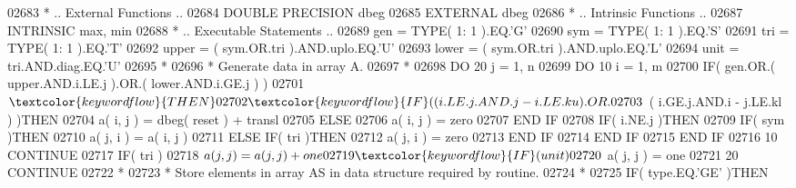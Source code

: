 \begin{DoxyCode}
02683 \textcolor{comment}{*     .. External Functions ..}
02684       \textcolor{keywordtype}{DOUBLE PRECISION}   dbeg
02685       \textcolor{keywordtype}{EXTERNAL}           dbeg
02686 \textcolor{comment}{*     .. Intrinsic Functions ..}
02687       \textcolor{keywordtype}{INTRINSIC}          max, min
02688 \textcolor{comment}{*     .. Executable Statements ..}
02689       gen = \textcolor{keywordtype}{TYPE}( 1: 1 ).EQ.\textcolor{stringliteral}{'G'}
02690       sym = \textcolor{keywordtype}{TYPE}( 1: 1 ).EQ.\textcolor{stringliteral}{'S'}
02691       tri = \textcolor{keywordtype}{TYPE}( 1: 1 ).EQ.\textcolor{stringliteral}{'T'}
02692       upper = ( sym.OR.tri ).AND.uplo.EQ.\textcolor{stringliteral}{'U'}
02693       lower = ( sym.OR.tri ).AND.uplo.EQ.\textcolor{stringliteral}{'L'}
02694       unit = tri.AND.diag.EQ.\textcolor{stringliteral}{'U'}
02695 \textcolor{comment}{*}
02696 \textcolor{comment}{*     Generate data in array A.}
02697 \textcolor{comment}{*}
02698       \textcolor{keywordflow}{DO} 20 j = 1, n
02699          \textcolor{keywordflow}{DO} 10 i = 1, m
02700             \textcolor{keywordflow}{IF}( gen.OR.( upper.AND.i.LE.j ).OR.( lower.AND.i.GE.j ) )
02701      $          \textcolor{keywordflow}{THEN}
02702                \textcolor{keywordflow}{IF}( ( i.LE.j.AND.j - i.LE.ku ).OR.
02703      $             ( i.GE.j.AND.i - j.LE.kl ) )\textcolor{keywordflow}{THEN}
02704                   a( i, j ) = dbeg( reset ) + transl
02705                \textcolor{keywordflow}{ELSE}
02706                   a( i, j ) = zero
02707 \textcolor{keywordflow}{               END IF}
02708                \textcolor{keywordflow}{IF}( i.NE.j )\textcolor{keywordflow}{THEN}
02709                   \textcolor{keywordflow}{IF}( sym )\textcolor{keywordflow}{THEN}
02710                      a( j, i ) = a( i, j )
02711                   \textcolor{keywordflow}{ELSE} \textcolor{keywordflow}{IF}( tri )\textcolor{keywordflow}{THEN}
02712                      a( j, i ) = zero
02713 \textcolor{keywordflow}{                  END IF}
02714 \textcolor{keywordflow}{               END IF}
02715 \textcolor{keywordflow}{            END IF}
02716    10    \textcolor{keywordflow}{CONTINUE}
02717          \textcolor{keywordflow}{IF}( tri )
02718      $      a( j, j ) = a( j, j ) + one
02719          \textcolor{keywordflow}{IF}( unit )
02720      $      a( j, j ) = one
02721    20 \textcolor{keywordflow}{CONTINUE}
02722 \textcolor{comment}{*}
02723 \textcolor{comment}{*     Store elements in array AS in data structure required by routine.}
02724 \textcolor{comment}{*}
02725       \textcolor{keywordflow}{IF}( type.EQ.\textcolor{stringliteral}{'GE'} )\textcolor{keywordflow}{THEN}

\end{DoxyCode}
